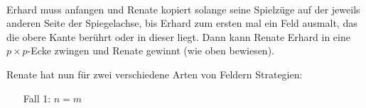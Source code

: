 \\
Erhard muss anfangen und Renate kopiert solange seine Spielzüge auf der jeweils anderen Seite der Spiegelachse, bis Erhard zum ersten mal ein Feld ausmalt, das die obere Kante berührt oder in dieser liegt. Dann kann Renate Erhard in eine $p\times p$-Ecke zwingen und Renate gewinnt (wie oben bewiesen).
\pagebreak

Renate hat nun für zwei verschiedene Arten von Feldern Strategien:
\begin{itemize}
	\item[Fall 1:] $n=m$
\end{itemize}

